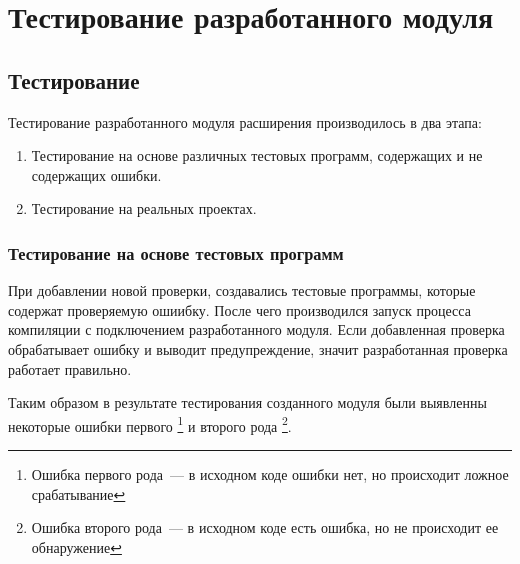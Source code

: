 \chapter{Тестирование разработанного модуля}

\section{Тестирование}
Тестирование разработанного модуля расширения производилось в два этапа:
\begin{enumerate}
	\item Тестирование на основе различных тестовых программ, содержащих и не содержащих ошибки.
	\item Тестирование на реальных проектах.
\end{enumerate}
\subsection{Тестирование на основе тестовых программ}

При добавлении новой проверки, создавались тестовые программы, которые содержат проверяемую ошиибку. 
После чего производился запуск процесса компиляции с подключением разработанного модуля. Если
добавленная проверка обрабатывает ошибку и выводит предупреждение, значит разработанная проверка
работает правильно. 

Таким образом в результате тестирования созданного модуля были выявленны некоторые ошибки первого
\footnote{Ошибка первого рода~--- в исходном коде ошибки нет, но происходит ложное срабатывание} и второго рода
\footnote{Ошибка второго рода~--- в исходном коде есть ошибка, но не происходит ее обнаружение}. 


